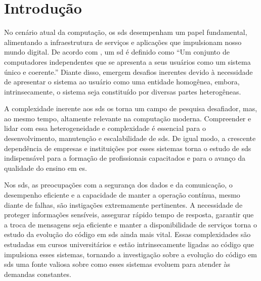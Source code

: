 

\chapter{Introdução}\label{cap:introducao}

No cenário atual da computação, os \gls{sds} desempenham um papel fundamental, alimentando a infraestrutura de serviços e aplicações que impulsionam nosso mundo digital. De acordo com , um \gls{sd} é definido como ``Um conjunto de computadores independentes que se apresenta a seus usuários como um sistema único e coerente.'' Diante disso, emergem desafios inerentes devido à necessidade de apresentar o sistema ao usuário como uma entidade homogênea, embora, intrinsecamente, o sistema seja constituído por diversas partes heterogêneas.

A complexidade inerente aos \gls{sds} os torna um campo de pesquisa desafiador, mas, ao mesmo tempo, altamente relevante na computação moderna. Compreender e lidar com essa heterogeneidade e complexidade é essencial para o desenvolvimento, manutenção e escalabilidade de \gls{sds}. De igual modo, a crescente dependência de empresas e instituições por esses sistemas torna o estudo de \gls{sds} indispensável para a formação de profissionais capacitados e para o avanço da qualidade do ensino em \gls{es}.

Nos \gls{sds}, as preocupações com a segurança dos dados e da comunicação, o desempenho eficiente e a capacidade de manter a operação contínua, mesmo diante de falhas, são instigações extremamente pertinentes. A necessidade de proteger informações sensíveis, assegurar rápido tempo de resposta, garantir que a troca de mensagens seja eficiente e manter a disponibilidade de serviços torna o estudo da evolução do código em \gls{sds} ainda mais vital. Essas complexidades são estudadas em cursos universitários e estão intrinsecamente ligadas ao código que impulsiona esses sistemas, tornando a investigação sobre a evolução do código em \gls{sds} uma fonte valiosa sobre como esses sistemas evoluem para atender às demandas constantes.


